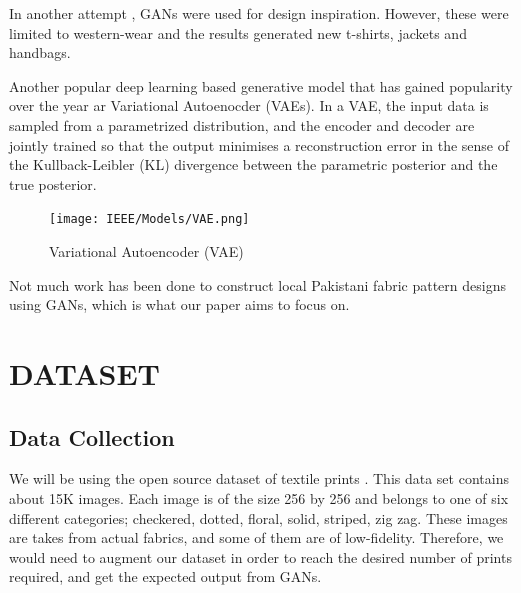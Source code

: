 \documentclass[conference]{IEEEtran}
\begin{document}
In another attempt \cite{b3}, GANs were used for design inspiration. However, these were limited to western-wear and the results generated new t-shirts, jackets and handbags.

Another popular deep learning based generative model that has gained popularity over the year ar Variational Autoenocder (VAEs).  In a VAE, the input data is sampled from a parametrized distribution, and the encoder and decoder are jointly trained so that the output minimises a reconstruction error in the sense of the Kullback-Leibler (KL) divergence between the parametric posterior and the true posterior.

\begin{figure}[h]
    \centering
    \texttt{[image: IEEE/Models/VAE.png]}\\
 
    \caption{Variational Autoencoder (VAE)}
    \label{fig:my_label}
\end{figure}

Not much work has been done to construct local Pakistani fabric pattern designs using GANs, which is what our paper aims to focus on. 

\section{DATASET}
\subsection{Data Collection}
We will be using the open source dataset of textile prints \cite{b10}. This data set contains about 15K images. Each image is of the size 256 by 256 and belongs to one  of  six different categories; checkered, dotted, floral, solid, striped, zig zag. These images are takes from actual fabrics, and some of them are of low-fidelity. Therefore, we would need to augment our dataset in order to reach the desired number of prints required, and get the expected output from GANs.
\end{document}
